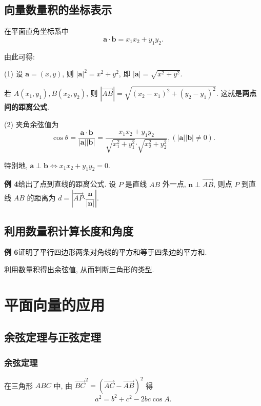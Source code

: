 \documentclass[titlepage]{ctexart}
\begin{document}
\subsection{向量数量积的坐标表示}

在平面直角坐标系中
\[
\boldsymbol{a \cdot b} = x_1x_2 + y_1y_2.
\]

由此可得:

(1) 设 $\boldsymbol{a} = (x, y)$, 则 $|\boldsymbol{a}|^2 = x^2 + y^2$, 即 $|\boldsymbol{a}| = \sqrt{x^2 + y^2}$.

若 $A(x_1, y_1), B(x_2, y_2)$, 则 $|\overrightarrow{AB}| = \sqrt{(x_2 - x_1)^2 + (y_2 - y_1)^2}$.
这就是\textbf{两点间的距离公式}.

(2) 夹角余弦值为
\[
\cos \theta = \dfrac{\boldsymbol{a \cdot b}}{|\boldsymbol{a}||\boldsymbol{b}|} 
            = \dfrac{x_1x_2 + y_1y_2}{\sqrt{x_1^2+y_1^2}\boldsymbol{\cdot}\sqrt{x_2^2+y_2^2}},
            (|\boldsymbol{a}||\boldsymbol{b}|\neq 0).
\]

特别地, $\boldsymbol{a} \perp \boldsymbol{b} \Leftrightarrow x_1x_2 + y_1y_2 = 0.$

\textbf{例 4}给出了点到直线的距离公式. 设 $P$ 是直线 $AB$ 外一点, $\boldsymbol{n} \perp \overrightarrow{AB}$,
则点 $P$ 到直线 $AB$ 的距离为 $d = \left|\overrightarrow{AP} \boldsymbol{\cdot} \dfrac{\boldsymbol{n}}{|\boldsymbol{n}|}\right|$.

\subsection{利用数量积计算长度和角度}

\textbf{例 6}证明了平行四边形两条对角线的平方和等于四条边的平方和.

利用数量积得出余弦值, 从而判断三角形的类型.


\section{平面向量的应用}

\subsection{余弦定理与正弦定理}

\subsubsection{余弦定理}

在三角形 $ABC$ 中, 由 $\overrightarrow{BC}^2 = (\overrightarrow{AC} - \overrightarrow{AB})^2$ 得
\[
a^2 = b^2 + c^2 - 2bc\cos A.
\]
\end{document}
